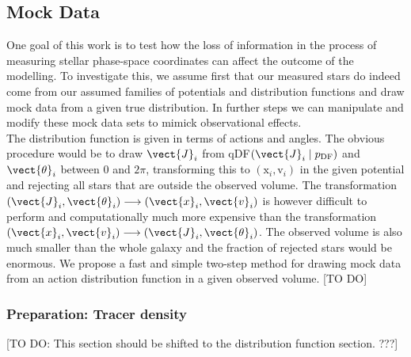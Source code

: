\subsection{Mock Data}

One goal of this work is to test how the loss of information in the process of measuring stellar phase-space coordinates can affect the outcome of the modelling. To investigate this, we assume first that our measured stars do indeed come from our assumed families of potentials and distribution functions and draw mock data from a given true distribution. In further steps we can manipulate and modify these mock data sets to mimick observational effects.\\
The distribution function is given in terms of actions and angles. The obvious procedure would be to draw $\vect{J}_i$ from qDF$(\vect{J}_i \mid p_\text{DF})$ and $\vect{\theta}_i$ between 0 and $2\pi$, transforming this to $(\text{x}_i,\text{v}_i)$ in the given potential and rejecting all stars that are outside the observed volume. The transformation $(\vect{J}_i,\vect{\theta}_i) \longrightarrow (\vect{x}_i,\vect{v}_i)$ is however difficult to perform and computationally much more expensive than the transformation $(\vect{x}_i,\vect{v}_i) \longrightarrow (\vect{J}_i,\vect{\theta}_i)$. The observed volume is also much smaller than the whole galaxy and the fraction of rejected stars would be enormous. We propose a fast and simple two-step method for drawing mock data from an action distribution function in a given observed volume.
[TO DO]

\subsubsection{Preparation: Tracer density} \label{sec:density}

[TO DO: This section should be shifted to the distribution function section. ???]

